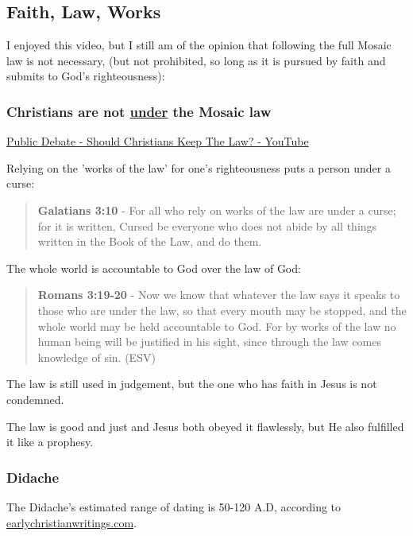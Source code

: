 \documentclass[11pt]{article}
\begin{document}
\subsection{Faith, Law, Works}
\label{sec:orgc2c90ca}
I enjoyed this video, but I still am of the opinion that following the full Mosaic law is not necessary, (but not prohibited, so long as it is pursued by faith and submits to God's righteousness):

\subsubsection{Christians are not \underline{under} the Mosaic law}
\label{sec:org3139ba1}

\href{https://www.youtube.com/watch?v=CNHKqhwu6Bo}{Public Debate - Should Christians Keep The Law? - YouTube}

Relying on the 'works of the law' for one's righteousness puts a person under a curse:

\begin{quote}
\textbf{Galatians 3:10} - For all who rely on works of the law are under a curse; for it is written, Cursed be everyone who does not abide by all things written in the Book of the Law, and do them.
\end{quote}

The whole world is accountable to God over the law of God:

\begin{quote}
\textbf{Romans 3:19-20} - Now we know that whatever the law says it speaks to those who are under the law, so that every mouth may be stopped, and the whole world may be held accountable to God. For by works of the law no human being will be justified in his sight, since through the law comes knowledge of sin. (ESV)
\end{quote}

The law is still used in judgement, but the one who has faith in Jesus is not condemned.

The law is good and just and Jesus both obeyed it flawlessly, but He also fulfilled it like a prophesy.

\subsubsection{Didache}
\label{sec:org7aa7ad0}
The Didache's estimated range of dating is 50-120 A.D, according to \href{https://www.earlychristianwritings.com/text/didache-roberts.html}{earlychristianwritings.com}.
\end{document}
